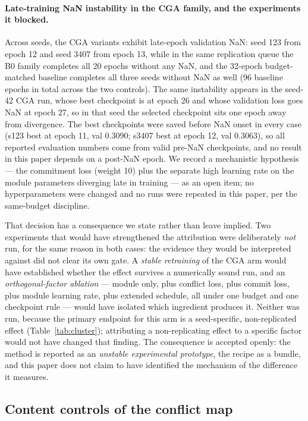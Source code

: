 \documentclass[pdflatex,sn-mathphys-num]{sn-jnl}
\theoremstyle{thmstyleone}%
\theoremstyle{thmstyletwo}%
\theoremstyle{thmstylethree}%
\begin{document}
\paragraph{Late-training NaN instability in the CGA family, and the experiments it blocked.}
Across seeds, the CGA variants exhibit late-epoch validation NaN: seed 123 from epoch 12 and seed 3407 from epoch 13, while in the same replication queue the B0 family completes all 20 epochs without any NaN, and the 32-epoch budget-matched baseline completes all three seeds without NaN as well (96 baseline epochs in total across the two controls). The same instability appears in the seed-42 CGA run, whose best checkpoint is at epoch 26 and whose validation loss goes NaN at epoch 27, so in that seed the selected checkpoint sits one epoch away from divergence. The best checkpoints were saved before NaN onset in every case (s123 best at epoch 11, val 0.3090; s3407 best at epoch 12, val 0.3063), so all reported evaluation numbers come from valid pre-NaN checkpoints, and no result in this paper depends on a post-NaN epoch. We record a mechanistic hypothesis --- the commitment loss (weight 10) plus the separate high learning rate on the module parameters diverging late in training --- as an open item; no hyperparameters were changed and no runs were repeated in this paper, per the same-budget discipline.

That decision has a consequence we state rather than leave implied. Two experiments that would have strengthened the attribution were deliberately \emph{not} run, for the same reason in both cases: the evidence they would be interpreted against did not clear its own gate. A \emph{stable retraining} of the CGA arm would have established whether the effect survives a numerically sound run, and an \emph{orthogonal-factor ablation} --- module only, plus conflict loss, plus commit loss, plus module learning rate, plus extended schedule, all under one budget and one checkpoint rule --- would have isolated which ingredient produces it. Neither was run, because the primary endpoint for this arm is a seed-specific, non-replicated effect (Table~\ref{tab:cluster}); attributing a non-replicating effect to a specific factor would not have changed that finding. The consequence is accepted openly: the method is reported as an \emph{unstable experimental prototype}, the recipe as a bundle, and this paper does not claim to have identified the mechanism of the difference it measures.

\subsection{Content controls of the conflict map}\label{sec:exp:controls}
\end{document}
